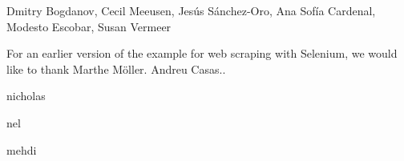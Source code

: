 Dmitry Bogdanov, Cecil Meeusen, Jesús Sánchez-Oro, Ana Sofía Cardenal, Modesto Escobar, Susan Vermeer

For an earlier version of the example for web scraping with Selenium, we would like to thank Marthe Möller.
Andreu Casas..

nicholas

nel

mehdi
